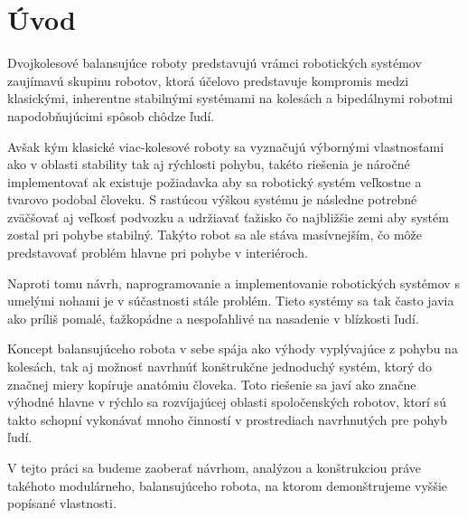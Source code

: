 \chapter{Úvod}


Dvojkolesové balansujúce roboty predstavujú vrámci robotických systémov zaujímavú skupinu robotov, ktorá účelovo predstavuje kompromis medzi klasickými, inherentne stabilnými systémami na kolesách a bipedálnymi robotmi napodobňujúcimi spôsob chôdze ľudí.
 
Avšak kým klasické viac-kolesové roboty sa vyznačujú výbornými vlastnosťami ako v oblasti stability tak aj rýchlosti pohybu, takéto riešenia je náročné implementovať ak existuje požiadavka aby sa robotický systém veľkostne a tvarovo podobal človeku. S rastúcou výškou systému je následne potrebné zväčšovať aj veľkosť podvozku a udržiavať ťažisko čo najbližšie zemi aby systém zostal pri pohybe stabilný. Takýto robot sa ale stáva masívnejším, čo môže predstavovať problém hlavne pri pohybe v interiéroch.

Naproti tomu návrh, naprogramovanie a implementovanie robotických systémov s umelými nohami je v súčastnosti stále problém. Tieto systémy sa tak často javia ako príliš pomalé, ťažkopádne a nespoľahlivé na nasadenie v blízkosti ľudí. 

Koncept balansujúceho robota v sebe spája ako výhody vyplývajúce z pohybu na kolesách, tak aj možnosť navrhnúť konštrukčne jednoduchý systém, ktorý do značnej miery kopíruje anatómiu človeka. Toto riešenie sa javí ako značne výhodné hlavne v rýchlo sa rozvíjajúcej oblasti spoločenských robotov, ktorí sú takto schopní vykonávať mnoho činností v prostrediach navrhnutých pre pohyb ľudí. 

V tejto práci sa budeme zaoberať návrhom, analýzou a konštrukciou práve takéhoto modulárneho, balansujúceho robota, na ktorom demonštrujeme vyššie popísané vlastnosti. 